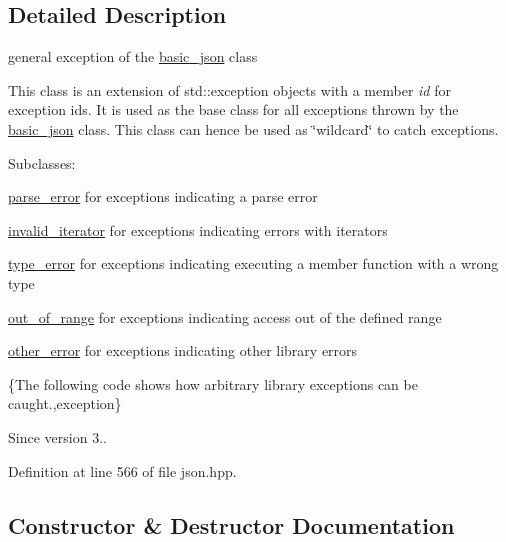 \subsection{Detailed Description}
general exception of the \hyperlink{classnlohmann_1_1basic__json}{basic\+\_\+json} class 

This class is an extension of {\ttfamily std\+::exception} objects with a member {\itshape id} for exception ids. It is used as the base class for all exceptions thrown by the \hyperlink{classnlohmann_1_1basic__json}{basic\+\_\+json} class. This class can hence be used as \char`\"{}wildcard\char`\"{} to catch exceptions.

Subclasses\+:
\begin{DoxyItemize}
\item \hyperlink{classnlohmann_1_1detail_1_1parse__error}{parse\+\_\+error} for exceptions indicating a parse error
\item \hyperlink{classnlohmann_1_1detail_1_1invalid__iterator}{invalid\+\_\+iterator} for exceptions indicating errors with iterators
\item \hyperlink{classnlohmann_1_1detail_1_1type__error}{type\+\_\+error} for exceptions indicating executing a member function with a wrong type
\item \hyperlink{classnlohmann_1_1detail_1_1out__of__range}{out\+\_\+of\+\_\+range} for exceptions indicating access out of the defined range
\item \hyperlink{classnlohmann_1_1detail_1_1other__error}{other\+\_\+error} for exceptions indicating other library errors
\end{DoxyItemize}

\{The following code shows how arbitrary library exceptions can be caught.,exception\}

\begin{DoxySince}{Since}
version 3.. 
\end{DoxySince}


Definition at line 566 of file json.\+hpp.



\subsection{Constructor \& Destructor Documentation}
\mbox{\label{classnlohmann_1_1detail_1_1exception_ae323ad0d53bc724414c2233164e65657}} 
